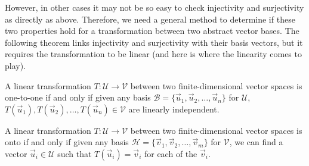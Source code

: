 However, in other cases it may not be so easy to check injectivity and surjectivity as directly as above. Therefore, we need a general method to determine if these two properties hold for a transformation between two abstract vector bases. The following theorem links injectivity and surjectivity with their basis vectors, but it requires the transformation to be linear (and here is where the linearity comes to play).

\begin{thm}
\label{thm:oneto_onebasis}
A linear transformation $T: \mathcal{U} \to \mathcal{V}$ between two finite-dimensional vector spaces is one-to-one if and only if given any basis $\mathcal{B} = \{\vec{u}_1, \vec{u}_2, \ldots, \vec{u}_n\}$ for $\mathcal{U}$, $T(\vec{u}_1), T(\vec{u}_2), \ldots, T(\vec{u}_n) \in \mathcal{V}$ are linearly independent.
\end{thm}
\begin{thm}
\label{thm:onto_basis}
A linear transformation $T: \mathcal{U} \to \mathcal{V}$ between two finite-dimensional vector spaces is onto if and only if given any basis $\mathcal{H} = \{\vec{v}_1, \vec{v}_2, \ldots, \vec{v}_m\}$ for $\mathcal{V}$, we can find a vector $\vec{u}_i \in \mathcal{U}$ such that $T(\vec{u}_i) = \vec{v}_i$ for each of the $\vec{v}_i$.
\end{thm}
